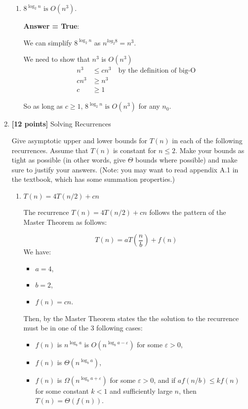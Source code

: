 \documentclass[11pt]{article}
\begin{document}
\begin{enumerate}
\begin{enumerate}
        \item $8^{\log_{2} n} \mbox{ is } O(n^{3})$.
  
\textbf{Answer = True}:

We can simplify  $8^{\log_{2} n}$ as $n^{log_2 8}=n^3$.

We need to show that $n^3$ is $O(n^3)$
\begin{align*}
    n^3 &\le cn^3 \quad \text{by the definition of big-O} \\
    cn^3 &\ge n^3 \\
    c &\ge 1
\end{align*}

So as long as $c \ge 1$, $8^{\log_{2} n} \mbox{ is } O(n^{3})$ for any $n_0$.
\end{enumerate}


\item \textbf{[12 points]} Solving Recurrences

Give asymptotic upper and lower bounds for $T(n)$ in each of the
following recurrences.  Assume that $T(n)$ is constant for $n \leq 2$.
Make your bounds as tight as possible (in other words, give $\Theta$ bounds
where possible) and make sure to justify your answers.
(Note: you may want to read appendix A.1 in the textbook, which has
some summation properties.)

\begin{enumerate}
\item $T(n) = 4T(n/2) + cn$

The recurrence $T(n) = 4T(n/2) + cn$ follows the pattern of the Master Theorem as follows:

\[ T(n) = aT\left(\frac{n}{b}\right) + f(n) \]
We have:
\begin{itemize}
    \item \( a = 4 \),
    \item \( b = 2 \),
    \item \( f(n) = cn \).
\end{itemize}

Then, by the Master Theorem states the the solution to the recurrence must be in one of the 3 following cases:
\begin{itemize}
    \item \( f(n) \) is \( n^{\log_b a} \) is \( O(n^{\log_b a - \varepsilon}) \) for some \( \varepsilon > 0 \),
    \item \( f(n) \) is \( \Theta(n^{\log_b a}) \),
    \item \( f(n) \) is \( \Omega(n^{\log_b a + \varepsilon}) \) for some \( \varepsilon > 0 \), and if \( a f(n/b) \leq k f(n) \) for some constant \( k < 1 \) and sufficiently large \( n \), then \( T(n) = \Theta(f(n)) \).
\end{itemize}


\end{enumerate}
\end{enumerate}
\end{document}
